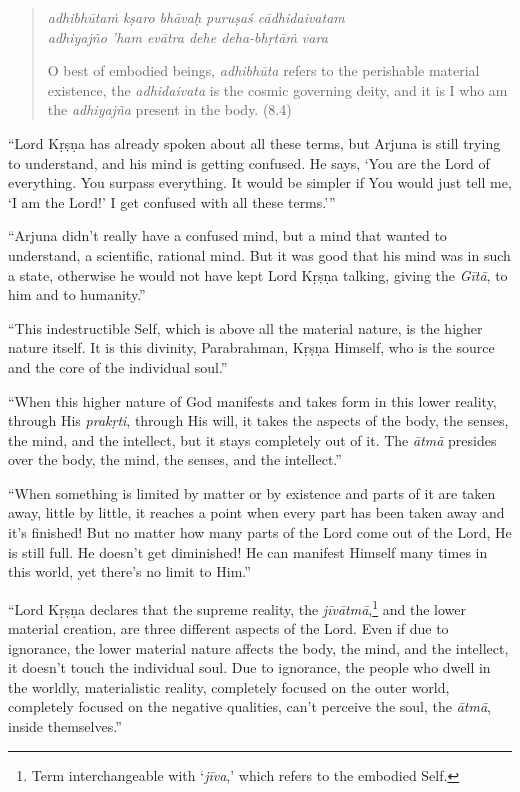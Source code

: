 \documentclass[12pt, twoside, openright]{memoir}
\begin{document}
\par
\begin{verse}
\textit{adhibhūtaṁ kṣaro bhāvaḥ puruṣaś cādhidaivatam} \\
\textit{adhiyajño ’ham evātra dehe deha-bhṛtāṁ vara}

\noindent O best of embodied beings, \textit{adhibhūta} refers to the perishable material existence, the \textit{adhidaivata} is the cosmic governing deity, and it is I who am the \textit{adhiyajña} present in the body. (8.4)
\end{verse}
\par




\enquote{Lord Kṛṣṇa has already spoken about all these terms, but Arjuna is still trying to understand, and his mind is getting confused. He says, \enquote{You are the Lord of everything. You surpass everything. It would be simpler if You would just tell me, ‘I am the Lord!’ I get confused with all these terms.}}

\enquote{Arjuna didn’t really have a confused mind, but a mind that wanted to understand, a scientific, rational mind. But it was good that his mind was in such a state, otherwise he would not have kept Lord Kṛṣṇa talking, giving the \textit{Gītā}, to him and to humanity.}

\enquote{This indestructible Self, which is above all the material nature, is the higher nature itself. It is this divinity, Parabrahman, Kṛṣṇa Himself, who is the source and the core of the individual soul.}

\enquote{When this higher nature of God manifests and takes form in this lower reality, through His \textit{prakṛti}, through His will, it takes the aspects of the body, the senses, the mind, and the intellect, but it stays completely out of it. The \textit{ātmā} presides over the body, the mind, the senses, and the intellect.}

\enquote{When something is limited by matter or by existence and parts of it are taken away, little by little, it reaches a point when every part has been taken away and it’s finished! But no matter how many parts of the Lord come out of the Lord, He is still full. He doesn’t get diminished! He can manifest Himself many times in this world, yet there’s no limit to Him.}

\enquote{Lord Kṛṣṇa declares that the supreme reality, the \textit{jīvātmā},\footnote{Term interchangeable with \enquote{\textit{jīva},} which refers to the embodied Self.} and the lower material creation, are three different aspects of the Lord. Even if due to ignorance, the lower material nature affects the body, the mind, and the intellect, it doesn’t touch the individual soul. Due to ignorance, the people who dwell in the worldly, materialistic reality, completely focused on the outer world, completely focused on the negative qualities, can’t perceive the soul, the \textit{ātmā}, inside themselves.}
\end{document}
